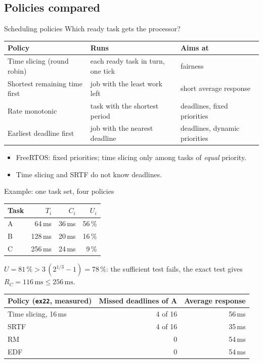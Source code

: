 \subsection{Policies compared}
\begin{frame}{Scheduling policies}
  Which ready task gets the processor?
  \begin{center}\small
  \begin{tabular}{@{}lll@{}}
    \toprule
    Policy & Runs & Aims at \\
    \midrule
    Time slicing (round robin) & each ready task in turn, one tick & fairness \\
    Shortest remaining time first & job with the least work left & short average response \\
    Rate monotonic & task with the shortest period & deadlines, fixed priorities \\
    Earliest deadline first & job with the nearest deadline & deadlines, dynamic priorities \\
    \bottomrule
  \end{tabular}
  \end{center}
  \begin{itemize}
    \item FreeRTOS: fixed priorities; time slicing only among tasks of \emph{equal} priority.
    \item Time slicing and SRTF do not know deadlines.
  \end{itemize}
\end{frame}

\begin{frame}{Example: one task set, four policies}
  \begin{center}\small
  \begin{tabular}{@{}lrrr@{}}
    \toprule
    Task & $T_i$ & $C_i$ & $U_i$ \\
    \midrule
    A & 64\,ms & 36\,ms & 56\,\% \\
    B & 128\,ms & 20\,ms & 16\,\% \\
    C & 256\,ms & 24\,ms & 9\,\% \\
    \bottomrule
  \end{tabular}
  \end{center}
  $U = 81\,\% > 3\,(2^{1/3}-1) = 78\,\%$: the sufficient test fails, the exact test gives $R_C = 116\,\text{ms} \le 256\,\text{ms}$.
  \begin{center}\small
  \begin{tabular}{@{}lrr@{}}
    \toprule
    Policy (\texttt{ex22}, measured) & Missed deadlines of A & Average response \\
    \midrule
    Time slicing, 16\,ms & 4 of 16 & 56\,ms \\
    SRTF & 4 of 16 & 35\,ms \\
    RM & 0 & 54\,ms \\
    EDF & 0 & 54\,ms \\
    \bottomrule
  \end{tabular}
  \end{center}
\end{frame}

